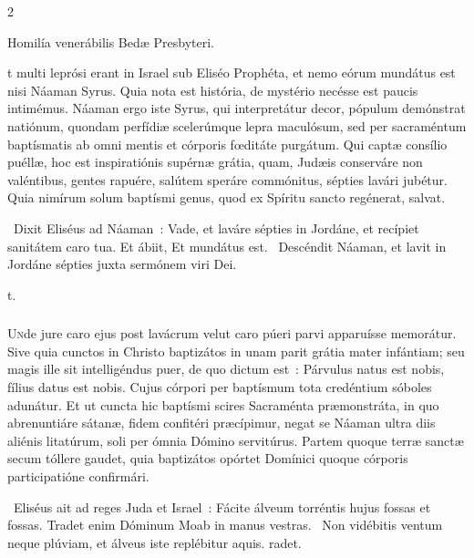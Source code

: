 \documentclass[9pt,twoside]{extarticle}
\begin{document}
\begin{multicols}{2}
{\begin{center}Homilía venerábilis Bedæ Presbyteri.\\
\end{center}
t multi leprósi erant in Israel sub Eliséo Prophéta, et nemo eórum mundátus est nisi Náaman Syrus. Quia nota est história, de mystério necésse est paucis intimémus. Náaman ergo iste Syrus, qui interpretátur decor, pópulum demónstrat natiónum, quondam perfídiæ scelerúmque lepra maculósum, sed per sacraméntum baptísmatis ab omni mentis et córporis fœditáte purgátum. Qui captæ consílio puéllæ, hoc est inspiratiónis supérnæ grátia, quam, Judæis conserváre non valéntibus, gentes rapuére, salútem speráre commónitus, sépties lavári jubétur. Quia nimírum solum baptísmi genus, quod ex Spíritu sancto regénerat, salvat.

\begin{tightlist}{}
\item {}~Dixit Eliséus ad Náaman~: Vade, et laváre sépties in Jordáne, et recípiet sanitátem caro tua. Et ábiit, \textred{*} Et mundátus est. ~Descéndit Náaman, et lavit in Jordáne sépties juxta sermónem viri Dei. \item {}t.
\end{tightlist}

\subsubsection*{\center {}}
\lettrine{U}nde jure caro ejus post lavácrum velut caro púeri parvi apparuísse memorátur. Sive quia cunctos in Christo baptizátos in unam parit grátia mater infántiam; seu magis ille sit intelligéndus puer, de quo dictum est~: Párvulus natus est nobis, fílius datus est nobis. Cujus córpori per baptísmum tota credéntium sóboles adunátur. Et ut cuncta hic baptísmi scires Sacraménta præmonstráta, in quo abrenuntiáre sátanæ, fidem confitéri præcípimur, negat se Náaman ultra diis aliénis litatúrum, soli per ómnia Dómino servitúrus. Partem quoque terræ sanctæ secum tóllere gaudet, quia baptizátos opórtet Domínici quoque córporis participatióne confirmári.

\begin{tightlist}{}
\item {}~Eliséus ait ad reges Juda et Israel~: Fácite álveum torréntis hujus fossas et fossas. \textred{*} Tradet enim Dóminum Moab in manus vestras. ~Non vidébitis ventum neque plúviam, et álveus iste replébitur aquis. radet.
\end{tightlist}

}
\end{multicols}
\end{document}
